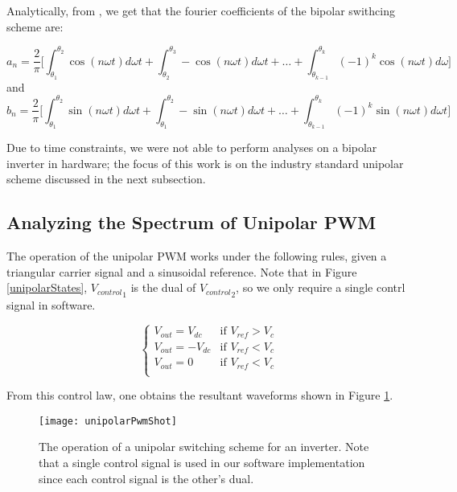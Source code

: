 Analytically, from \cite{fourierAnlaysis}, we get that the fourier coefficients of the bipolar swithcing scheme are:

\begin{equation}
a_n = \frac{2}{\pi} \Big[\int_{\theta_1}^{\theta_2} \cos(n\omega t) d\omega t + \int_{\theta_2}^{\theta_3} -\cos(n\omega t)d\omega t +\ldots +
\int_{\theta_{k-1}}^{\theta_{k}} (-1)^k \cos(n\omega t)d\omega \Big]
\end{equation} 
and 
\begin{equation}
b_n = \frac{2}{\pi} \Big[\int_{\theta_1}^{\theta_2} \sin(n\omega t) d\omega t + \int_{\theta_1}^{\theta_2} -\sin(n\omega t)d\omega t +\ldots +
\int_{\theta_{k-1}}^{\theta_{k}} (-1)^k \sin(n\omega t)d\omega t \Big]
\end{equation} 

Due to time constraints, we were not able to perform analyses on a bipolar inverter in hardware; the focus of this work is on the industry standard unipolar scheme discussed in the next subsection. 

\subsection{Analyzing the Spectrum of Unipolar PWM}
\label{uniSpectrum}
The operation of the unipolar PWM works under the following rules, given a triangular carrier signal and a sinusoidal reference. Note that in Figure \ref{unipolarStates}, ${V_{control}}_{1}$ is the dual of ${V_{control}}_{2}$, so we only require a single contrl signal in software.

\begin{equation}
\label{unipolarStates}
\begin{cases}
V_{out} = V_{dc} &\mbox{if $V_{ref} > V_{c}$}  \\
V_{out} = -V_{dc} &\mbox{if $V_{ref} < V_{c}$}  \\
V_{out} = 0 &\mbox{if $V_{ref} < V_{c}$}  \\
\end{cases}
\end{equation}

From this control law, one obtains the resultant waveforms shown in Figure \ref{unipolarPwmShot}.
\begin{figure}
\centering
\texttt{[image: unipolarPwmShot]}
\caption{The operation of a unipolar switching scheme for an inverter. Note that a single control signal is used in our software implementation since each control signal is the other's dual. \cite{fourierAnalysis}}
\label{unipolarPwmShot}
\end{figure}


